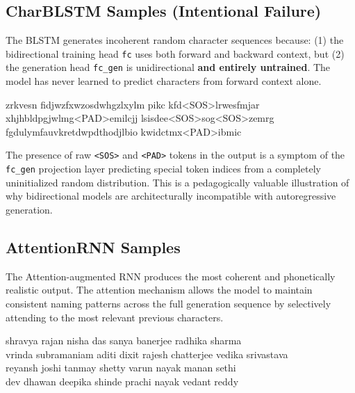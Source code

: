\documentclass[11pt,a4paper]{article}
\begin{document}
\subsection{CharBLSTM Samples (Intentional Failure)}

\begin{warningBox}
The BLSTM generates incoherent random character sequences because: (1) the bidirectional training head \texttt{fc} uses both forward and backward context, but (2) the generation head \texttt{fc\_gen} is unidirectional \textbf{and entirely untrained}. The model has never learned to predict characters from forward context alone.
\end{warningBox}

\begin{codeBox}
zrkvesn \quad fidjwzfxwzosdwhgzlxylm \quad pikc kfd<SOS>lrwesfmjar \\
xhjhbldpgjwlmg<PAD>emilcjj \quad lsisdee<SOS>sog<SOS>zemrg \\
fgdulymfauvkretdwpdthodjlbio \quad kwidctmx<PAD>ibmic
\end{codeBox}

\vspace{0.5em}
The presence of raw \texttt{<SOS>} and \texttt{<PAD>} tokens in the output is a symptom of the \texttt{fc\_gen} projection layer predicting special token indices from a completely uninitialized random distribution. This is a pedagogically valuable illustration of why bidirectional models are architecturally incompatible with autoregressive generation.

\subsection{AttentionRNN Samples}
The Attention-augmented RNN produces the most coherent and phonetically realistic output. The attention mechanism allows the model to maintain consistent naming patterns across the full generation sequence by selectively attending to the most relevant previous characters.

\begin{codeBox}[Selected AttentionRNN Generated Names (Temperature = 0.8)]
shravya rajan \quad nisha das \quad sanya banerjee \quad radhika sharma \\
vrinda subramaniam \quad aditi dixit \quad rajesh chatterjee \quad vedika srivastava \\
reyansh joshi \quad tanmay shetty \quad varun nayak \quad manan sethi \\
dev dhawan \quad deepika shinde \quad prachi nayak \quad vedant reddy
\end{codeBox}
\end{document}
